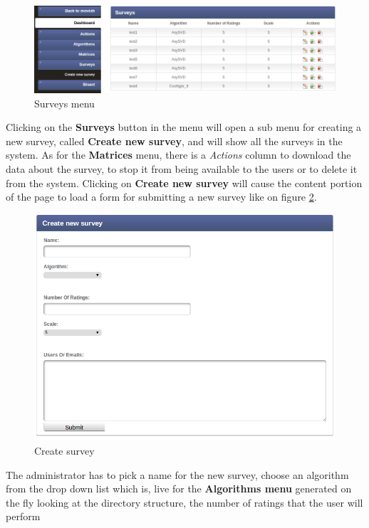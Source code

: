 \begin{figure}
  \centering
  \includegraphics[width=\textwidth]{figures/survey_menu.png}
  \caption{Surveys menu}
  \label{fig:surveys_menu}
\end{figure}

Clicking on the \textbf{Surveys} button in the menu will open a sub menu for creating a new survey, called \textbf{Create new survey}, and will show all the surveys in the system. As for the \textbf{Matrices} menu, there is a \textit{Actions} column to download the data about the survey, to stop it from being available to the users or to delete it from the system. Clicking on \textbf{Create new survey} will cause the content portion of the page to load a form for submitting a new survey like on figure \ref{fig:create_survey}.

\begin{figure}
  \centering
  \includegraphics[width=\textwidth]{figures/create_survey.png}
  \caption{Create survey}
  \label{fig:create_survey}
\end{figure}

The administrator has to pick a name for the new survey, choose an algorithm from the drop down list which is, live for the \textbf{Algorithms menu} generated on the fly looking at the directory structure, the number of ratings that the user will perform

